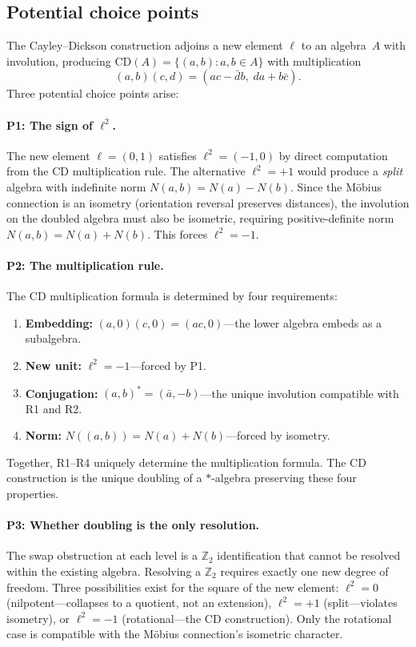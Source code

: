 \documentclass[12pt,a4paper]{article}
\theoremstyle{definition}
\theoremstyle{remark}
\newcommand{\Z}{\mathbb{Z}}
\newcommand{\CD}{\mathrm{CD}}
\begin{document}
\subsection{Potential choice points}

The Cayley--Dickson construction adjoins a new element $\ell$ to
an algebra~$A$ with involution, producing
$\CD(A) = \{(a, b) : a, b \in A\}$ with multiplication
\[
  (a, b)(c, d) = (ac - \bar{d}b,\; da + b\bar{c}).
\]
Three potential choice points arise:

\paragraph{P1: The sign of $\ell^2$.}
The new element $\ell = (0, 1)$ satisfies $\ell^2 = (-1, 0)$ by
direct computation from the CD multiplication rule. The
alternative $\ell^2 = +1$ would produce a \emph{split} algebra
with indefinite norm $N(a,b) = N(a) - N(b)$. Since the M\"{o}bius
connection is an isometry (orientation reversal preserves
distances), the involution on the doubled algebra must also be
isometric, requiring positive-definite norm
$N(a,b) = N(a) + N(b)$. This forces $\ell^2 = -1$.

\paragraph{P2: The multiplication rule.}
The CD multiplication formula is determined by four requirements:
\begin{enumerate}[label=(R\arabic*), nosep]
  \item \textbf{Embedding:} $(a, 0)(c, 0) = (ac, 0)$---the
  lower algebra embeds as a subalgebra.
  \item \textbf{New unit:} $\ell^2 = -1$---forced by P1.
  \item \textbf{Conjugation:} $(a, b)^* = (\bar{a}, -b)$---the
  unique involution compatible with R1 and R2.
  \item \textbf{Norm:} $N((a,b)) = N(a) + N(b)$---forced by
  isometry.
\end{enumerate}
Together, R1--R4 uniquely determine the multiplication formula.
The CD construction is the unique doubling of a $*$-algebra
preserving these four properties.

\paragraph{P3: Whether doubling is the only resolution.}
The swap obstruction at each level is a $\Z_2$ identification
that cannot be resolved within the existing algebra. Resolving a
$\Z_2$ requires exactly one new degree of freedom. Three
possibilities exist for the square of the new element:
$\ell^2 = 0$ (nilpotent---collapses to a quotient, not an
extension), $\ell^2 = +1$ (split---violates isometry), or
$\ell^2 = -1$ (rotational---the CD construction). Only the
rotational case is compatible with the M\"{o}bius connection's
isometric character.
\end{document}
